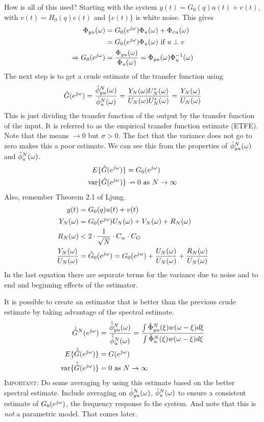 \documentclass[lecture,12pt,]{pcms-l}
\begin{document}
How is all of this used? Starting with the system $y(t)=G_0(q)u(t)+v(t)$, with $v(t)=H_0(q)e(t)$ and $\{e(t)\}$ is white noise. This gives
\begin{align*}
\Phi_{yu}(\omega) &= G_0(e^{j\omega})\Phi_u(\omega) + \Phi_{vu}(\omega) \\
&= G_0(e^{j\omega})\Phi_u(\omega) \text{ if } u\perp v \\
\Rightarrow G_0(e^{j\omega}) &= \frac{\Phi_{yu}(\omega)}{\Phi_u(\omega)} = \Phi_{yu}(\omega)\Phi_u^{-1}(\omega)
\end{align*}
The next step is to get a crude estimate of the transfer function using
$$\hat{G}(e^{j\omega}) = \frac{\hat{\phi}_{yu}^N(\omega)}{\hat{\phi}_u^N(\omega)} = \frac{Y_N(\omega)U_N^*(\omega)}{U_N(\omega)U_N^*(\omega)} = \frac{Y_N(\omega)}{U_N(\omega)}$$
This is just dividing the transfer function of the output by the transfer function of the input. It is referred to as the empirical transfer function estimate (ETFE). Note that the means $\to 0$ but $\sigma>0$. The fact that the variance does not go to zero makes this a poor estimate. We can see this from the properties of $\hat{\phi}_{yu}^N(\omega)$ and $\hat{\phi}_u^N(\omega)$.
\begin{align*}
E\{\hat{G}(e^{j\omega})\} &= G_0(e^{j\omega}) \\
\text{var}\{\hat{G}(e^{j\omega})\} &\nrightarrow 0 \text{ as } N\to\infty
\end{align*}
Also, remember Theorem 2.1 of Ljung.
\begin{align*}
y(t) &= G_0(q)u(t) + v(t) \\
Y_N(\omega) &= G_0(e^{j\omega})U_N(\omega) + V_N(\omega) + R_N(\omega) \\
R_N(\omega) &< 2\cdot \frac{1}{\sqrt{N}}\cdot C_w\cdot C_G \\
\frac{Y_N(\omega)}{U_N(\omega)} &= \hat{G}_0(e^{j\omega}) = G_0(e^{j\omega}) + \frac{U_N(\omega)}{U_N(\omega)} + \frac{R_N(\omega)}{U_N(\omega)}
\end{align*}
In the last equation there are separate terms for the variance due to noise and to end and beginning effects of the estimator.

It is possible to create an estimator that is better than the previous crude estimate by taking advantage of the spectral estimate.
\begin{align*}
\hat{\hat{G}}^N(e^{j\omega}) &= \frac{\hat{\hat{\phi}}_{yu}^N(\omega)}{\hat{\hat{\phi}}_u^N(\omega)} = \frac{\int\hat{\Phi}_{yu}^N(\xi)w(\omega-\xi)d\xi}{\int \hat{\Phi}_u^N(\xi)w(\omega-\xi)d\xi} \\
E\{\hat{\hat{G}}(e^{j\omega})\} &= G(e^{j\omega}) \\
\text{var}\{\hat{\hat{G}}(e^{j\omega})\} &= 0 \text{ as } N\to\infty
\end{align*}
\textsc{Important:} Do some averaging by using this estimate based on the better spectral estimate. Include averaging on $\hat{\phi}_{yu}^N(\omega)$, $\hat{\phi}_u^N(\omega)$ to ensure a consistent estimate of $G_0(e^{j\omega})$, the frequency response fo the system. And note that this is \textit{not} a parametric model. That comes later.
\end{document}
